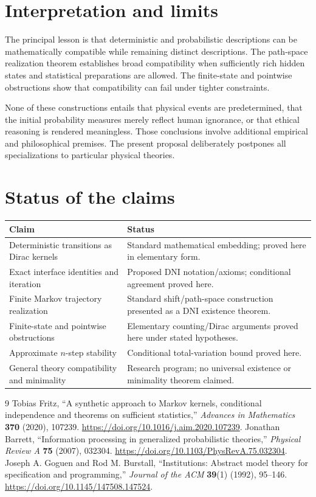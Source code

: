 \documentclass[11pt,letterpaper]{article}
\theoremstyle{definition}
\theoremstyle{remark}
\begin{document}
\clearpage
\section{Interpretation and limits}
The principal lesson is that deterministic and probabilistic descriptions can be mathematically compatible while remaining distinct descriptions. The path-space realization theorem establishes broad compatibility when sufficiently rich hidden states and statistical preparations are allowed. The finite-state and pointwise obstructions show that compatibility can fail under tighter constraints.

None of these constructions entails that physical events are predetermined, that the initial probability measures merely reflect human ignorance, or that ethical reasoning is rendered meaningless. Those conclusions involve additional empirical and philosophical premises. The present proposal deliberately postpones all specializations to particular physical theories.

\section*{Status of the claims}
\begin{tabularx}{\textwidth}{@{}>{\raggedright\arraybackslash}p{}>{\raggedright\arraybackslash}X@{}}
\toprule
\textbf{Claim} & \textbf{Status}\\
\midrule
Deterministic transitions as Dirac kernels & Standard mathematical embedding; proved here in elementary form.\\
Exact interface identities and iteration & Proposed DNI notation/axioms; conditional agreement proved here.\\
Finite Markov trajectory realization & Standard shift/path-space construction presented as a DNI existence theorem.\\
Finite-state and pointwise obstructions & Elementary counting/Dirac arguments proved here under stated hypotheses.\\
Approximate $n$-step stability & Conditional total-variation bound proved here.\\
General theory compatibility and minimality & Research program; no universal existence or minimality theorem claimed.\\
\bottomrule
\end{tabularx}

\begin{thebibliography}{9}
 Tobias Fritz, ``A synthetic approach to Markov kernels, conditional independence and theorems on sufficient statistics,'' \emph{Advances in Mathematics} \textbf{370} (2020), 107239. \url{https://doi.org/10.1016/j.aim.2020.107239}.
 Jonathan Barrett, ``Information processing in generalized probabilistic theories,'' \emph{Physical Review A} \textbf{75} (2007), 032304. \url{https://doi.org/10.1103/PhysRevA.75.032304}.
 Joseph A. Goguen and Rod M. Burstall, ``Institutions: Abstract model theory for specification and programming,'' \emph{Journal of the ACM} \textbf{39}(1) (1992), 95--146. \url{https://doi.org/10.1145/147508.147524}.
\end{thebibliography}
\end{document}
